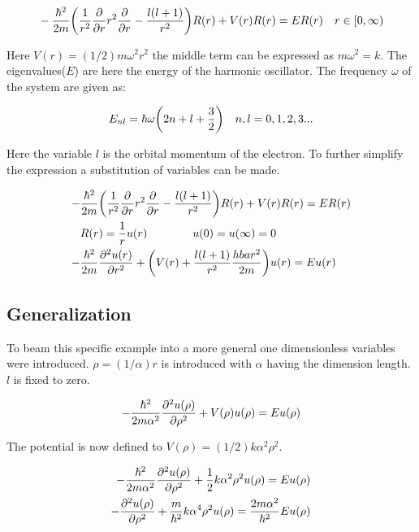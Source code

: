 \begin{align}
	&-\frac{\hbar^2}{2m}\qty(\frac{1}{r^2}\pdv{r}r^2\pdv{r}-\frac{l(l+1)}{r^2})R(r)+V(r)R(r)=ER(r) &r\in[0,\infty)
\end{align}

Here $V(r)=(1/2)m\omega^2r^2$ the middle term can be expressed as $m\omega^2=k$. The eigenvalues($E$) are here the energy of the harmonic oscillator.  The frequency $\omega$ of the system are given as:

\begin{align}
	E_{nl}&=\hbar\omega\qty(2n+l+\frac{3}{2}) &n,l=0,1,2,3...
\end{align}

Here the variable $l$ is the orbital momentum of the electron. To further simplify the expression a substitution of variables can be made.
 
\begin{align*}
	-&\frac{\hbar^2}{2m}\qty(\frac{1}{r^2}\pdv{r}r^2\pdv{r}-\frac{l(l+1)}{r^2})R(r)+V(r)R(r)=ER(r)\\
	&R(r)=\frac{1}{r}u(r)\qquad \qquad u(0)=u(\infty)=0\\
	-&\frac{\hbar^2}{2m}\pdv[2]{u(r)}{r}+\qty(V(r)+\frac{l(l+1)}{r^2}\frac{hbar^2}{2m})u(r)=Eu(r)\\
\end{align*}

\subsection{Generalization}

To beam this specific example into a more general one dimensionless variables were introduced.
$\rho=(1/\alpha)r$ is introduced with $\alpha$ having the dimension length. $l$ is fixed to zero. 

\begin{align*}
	-\frac{\hbar^2}{2m\alpha^2}\pdv[2]{u(\rho)}{\rho}+V(\rho)u(\rho)=Eu(\rho)\\
\end{align*}

The potential is now defined to $V(\rho)=(1/2)k\alpha^2\rho^2$.

\begin{align*}
	-\frac{\hbar^2}{2m\alpha^2}\pdv[2]{u(\rho)}{\rho}+\frac{1}{2}k\alpha^2\rho^2u(\rho)=Eu(\rho)\\
	-\pdv[2]{u(\rho)}{\rho}+\frac{m}{\hbar^2}k\alpha^4\rho^2u(\rho)=\frac{2m\alpha^2}{\hbar^2}Eu(\rho)\\	
\end{align*}

